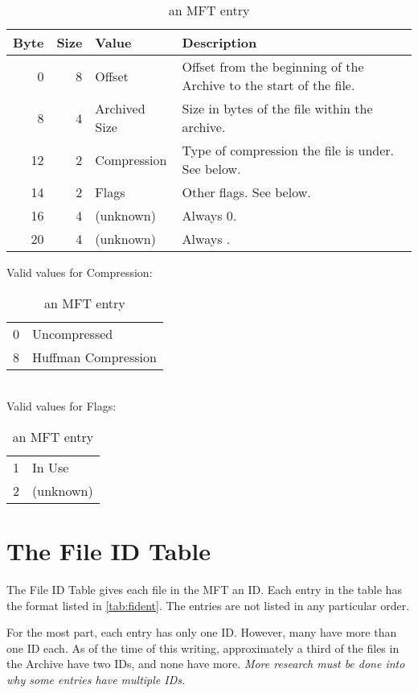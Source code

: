 \begin{table}[htbp]\begin{center}
	\caption{an MFT entry}
	\label{tab:mftent}
	
	\begin{tabular}{|r|r|l|p{2.5in}|}
		\hline
		\textbf{Byte} & \textbf{Size} & \textbf{Value} & \textbf{Description} \\
		\hline
		 0 & 8 & Offset        & Offset from the beginning of the Archive to the
		                         start of the file.  \\
		\hline
		 8 & 4 & Archived Size & Size in bytes of the file within the archive.  \\
		\hline
		12 & 2 & Compression   & Type of compression the file is under.  See below.  \\
		\hline
		14 & 2 & Flags         & Other flags.  See below.  \\
		\hline
		16 & 4 & (unknown)     & Always 0.  \\
		\hline
		20 & 4 & (unknown)     & Always \hex{4867~4BC7}.  \\
		\hline
	\end{tabular}
	
	Valid values for Compression:
	\begin{tabular}{rl}
		\hline
		0 & Uncompressed \\
		8 & Huffman Compression \\
		\hline
	\end{tabular}
	\\
	
	Valid values for Flags:
	\begin{tabular}{rl}
		\hline
		1 & In Use \\
		2 & (unknown) \\
		\hline
	\end{tabular}
\end{center}\end{table}


\section{The File ID Table}
\label{sec:fidtab}

The File ID Table gives each file in the MFT an ID.  Each entry in the table
has the format listed in \autoref{tab:fident}.  The entries are not listed in
any particular order.

For the most part, each entry has only one ID.  However, many have more than one
ID each.  As of the time of this writing, approximately a third of the files in
the Archive have two IDs, and none have more.  \emph{More research must be done
into why some entries have multiple IDs.}

